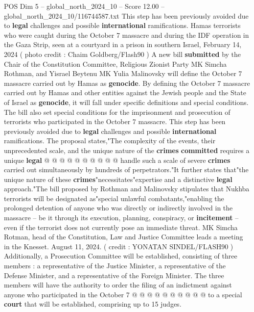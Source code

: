 \begin{textsample}{POS Dim 5 – global\_north\_2024\_10 – Score 12.00 – global\_north\_2024\_10/116744587.txt}  \label{ex:f5_pos_409}
This step has been previously avoided due to \textbf{legal} challenges and possible \textbf{international} ramifications.
Hamas terrorists who were caught during the October 7 massacre and during the IDF operation in the Gaza Strip, seen at a courtyard in a prison in southern Israel, February 14, 2024 ( photo credit : Chaim Goldberg/Flash90 ) A new bill \textbf{submitted} by the Chair of the Constitution Committee, Religious Zionist Party MK Simcha Rothman, and Yisrael Beytenu MK Yulia Malinovsky will define the October 7 massacre carried out by Hamas as \textbf{genocide}.
By defining the October 7 massacre carried out by Hamas and other entities against the Jewish people and the State of Israel as \textbf{genocide}, it will fall under specific definitions and special conditions.
The bill also set special conditions for the imprisonment and prosecution of terrorists who participated in the October 7 massacre.
This step has been previously avoided due to \textbf{legal} challenges and possible \textbf{international} ramifications.
The proposal states,"The complexity of the events, their unprecedented scale, and the unique nature of the \textbf{crimes} \textbf{committed} requires a unique \textbf{legal} @ @ @ @ @ @ @ @ @ @ handle such a scale of severe \textbf{crimes} carried out simultaneously by hundreds of perpetrators."It further states that"the unique nature of these \textbf{crimes}"necessitates"expertise and a distinctive \textbf{legal} approach."The bill proposed by Rothman and Malinovsky stipulates that Nukhba terrorists will be designated as"special unlawful combatants,"enabling the prolonged detention of anyone who was directly or indirectly involved in the massacre -- be it through its execution, planning, conspiracy, or \textbf{incitement} -- even if the terrorist does not currently pose an immediate threat.
MK Simcha Rotman, head of the Constitution, Law and Justice Committee leads a meeting in the Knesset.
August 11, 2024. ( credit : YONATAN SINDEL/FLASH90 ) Additionally, a Prosecution Committee will be established, consisting of three members : a representative of the Justice Minister, a representative of the Defense Minister, and a representative of the Foreign Minister.
The three members will have the authority to order the filing of an indictment against anyone who participated in the October 7 @ @ @ @ @ @ @ @ @ @ to a special \textbf{court} that will be established, comprising up to 15 judges.

\end{textsample}
